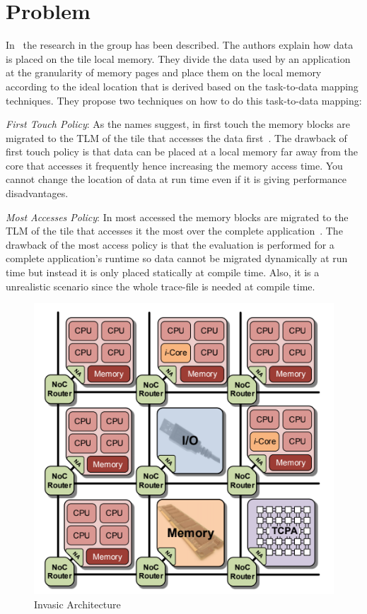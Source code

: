 \documentclass{listhesis}
\begin{document}
\section{Problem}
In~\cite{lispaper} the research in the group has been described. The authors explain how data is placed on the tile local memory. They divide the data used by an application at the granularity of memory pages and place them on the local memory according to the ideal location that is derived based on the task-to-data mapping techniques. They propose two techniques on how to do this task-to-data mapping:\\
\par
\textit{First Touch Policy}: As the names suggest, in first touch the memory blocks are migrated to the TLM of the tile that accesses the data first~\cite{lispaper}. The drawback of first touch policy is that data can be placed at a local memory far away from the core that accesses it frequently hence increasing the memory access time. You cannot change the location of data at run time even if it is giving performance disadvantages.\\ 
\par
\textit{Most Accesses Policy}: In most accessed the memory blocks are migrated to the TLM of the tile that accesses it the most over the complete application~\cite{lispaper}. The drawback of the most access policy is that the evaluation is performed for a complete application's runtime so data cannot be migrated dynamically at run time but instead it is only placed statically at compile time. Also, it is a unrealistic scenario since the whole trace-file is needed at compile time. 
\begin{figure}[h!]
  \includegraphics[width=0.7\linewidth]{multi-core,tile.png}
  \centering
  \caption{Invasic Architecture~\cite{iNetworkAdapter}}
  \label{fig:multi-core,tile}
\end{figure}
\end{document}
